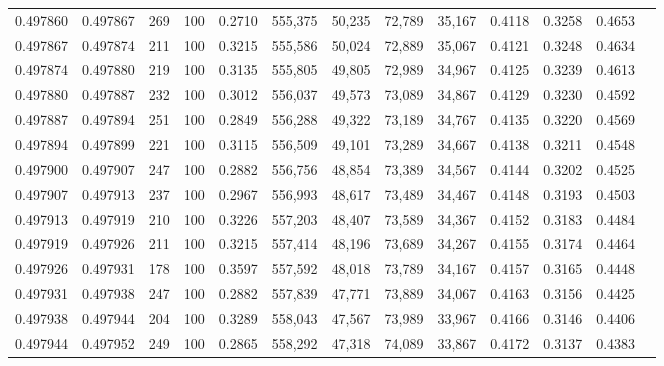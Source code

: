 \begin{tabular}{rrrrrrrrrrrrr}
0.497860 & 0.497867 &   269 & 100 &                                     0.2710 & 555,375 &  50,235 &  72,789 &  35,167 & 0.4118 & 0.3258 & 0.4653 \\
0.497867 & 0.497874 &   211 & 100 &                                     0.3215 & 555,586 &  50,024 &  72,889 &  35,067 & 0.4121 & 0.3248 & 0.4634 \\
0.497874 & 0.497880 &   219 & 100 &                                     0.3135 & 555,805 &  49,805 &  72,989 &  34,967 & 0.4125 & 0.3239 & 0.4613 \\
0.497880 & 0.497887 &   232 & 100 &                                     0.3012 & 556,037 &  49,573 &  73,089 &  34,867 & 0.4129 & 0.3230 & 0.4592 \\
0.497887 & 0.497894 &   251 & 100 &                                     0.2849 & 556,288 &  49,322 &  73,189 &  34,767 & 0.4135 & 0.3220 & 0.4569 \\
0.497894 & 0.497899 &   221 & 100 &                                     0.3115 & 556,509 &  49,101 &  73,289 &  34,667 & 0.4138 & 0.3211 & 0.4548 \\
0.497900 & 0.497907 &   247 & 100 &                                     0.2882 & 556,756 &  48,854 &  73,389 &  34,567 & 0.4144 & 0.3202 & 0.4525 \\
0.497907 & 0.497913 &   237 & 100 &                                     0.2967 & 556,993 &  48,617 &  73,489 &  34,467 & 0.4148 & 0.3193 & 0.4503 \\
0.497913 & 0.497919 &   210 & 100 &                                     0.3226 & 557,203 &  48,407 &  73,589 &  34,367 & 0.4152 & 0.3183 & 0.4484 \\
0.497919 & 0.497926 &   211 & 100 &                                     0.3215 & 557,414 &  48,196 &  73,689 &  34,267 & 0.4155 & 0.3174 & 0.4464 \\
0.497926 & 0.497931 &   178 & 100 &                                     0.3597 & 557,592 &  48,018 &  73,789 &  34,167 & 0.4157 & 0.3165 & 0.4448 \\
0.497931 & 0.497938 &   247 & 100 &                                     0.2882 & 557,839 &  47,771 &  73,889 &  34,067 & 0.4163 & 0.3156 & 0.4425 \\
0.497938 & 0.497944 &   204 & 100 &                                     0.3289 & 558,043 &  47,567 &  73,989 &  33,967 & 0.4166 & 0.3146 & 0.4406 \\
0.497944 & 0.497952 &   249 & 100 &                                     0.2865 & 558,292 &  47,318 &  74,089 &  33,867 & 0.4172 & 0.3137 & 0.4383 \\

\end{tabular}
